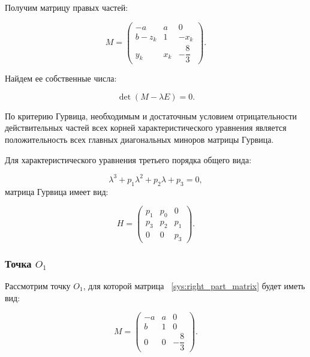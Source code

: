 \documentclass[14pt,a4paper]{extarticle}
\theoremstyle{plain}
\begin{document}
	Получим матрицу правых частей:
	
	\begin{equation}
		M = \begin{pmatrix}
			-a & a & 0 \\[6pt]
			b - z_k & 1 & -x_k \\[6pt]
			y_k & x_k & -\dfrac{8}{3}
			\end{pmatrix}.
		\label{sys:right_part_matrix}
	\end{equation}
	
	Найдем ее собственные числа:
	
	\begin{equation}
		\det(M - \lambda E) = 0.\nonumber
	\end{equation}
	
	По критерию Гурвица, необходимым и достаточным условием отрицательности действительных частей всех корней характеристического уравнения является положительность всех главных диагональных миноров матрицы Гурвица.
	
	Для характеристического уравнения третьего порядка общего вида:
	
	\begin{equation}
		\lambda^3 + p_1\lambda^2 + p_2\lambda + p_3 = 0,\nonumber
	\end{equation}
	матрица Гурвица имеет вид:
	
	\begin{equation}
		H = \begin{pmatrix}
			p_1 & p_0 & 0 \\
			p_3 & p_2 & p_1 \\
			0 & 0 & p_3
		\end{pmatrix}.\nonumber
	\end{equation}
	
	\subsubsection{Точка $O_1$}
	
	Рассмотрим точку $O_1$, для которой матрица ~\eqref{sys:right_part_matrix} будет иметь вид:
	
	\begin{equation}
		M = \begin{pmatrix}
			-a & a & 0 \\[6pt]
			b  & 1 & 0 \\[6pt]
			0 & 0 & -\dfrac{8}{3}
		\end{pmatrix}.\nonumber
	\end{equation}
	
\end{document}
